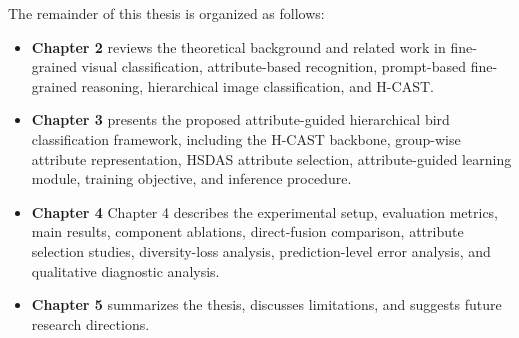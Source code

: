 The remainder of this thesis is organized as follows:

\begin{itemize}
    \item \textbf{Chapter 2} reviews the theoretical background and related work in fine-grained visual classification, attribute-based recognition, prompt-based fine-grained reasoning, hierarchical image classification, and H-CAST.

    \item \textbf{Chapter 3} presents the proposed attribute-guided hierarchical bird classification framework, including the H-CAST backbone, group-wise attribute representation, HSDAS attribute selection, attribute-guided learning module, training objective, and inference procedure.

    \item \textbf{Chapter 4} Chapter 4 describes the experimental setup, evaluation metrics, main results, component ablations, direct-fusion comparison, attribute selection studies, diversity-loss analysis, prediction-level error analysis, and qualitative diagnostic analysis.

    \item \textbf{Chapter 5} summarizes the thesis, discusses limitations, and suggests future research directions.
\end{itemize}